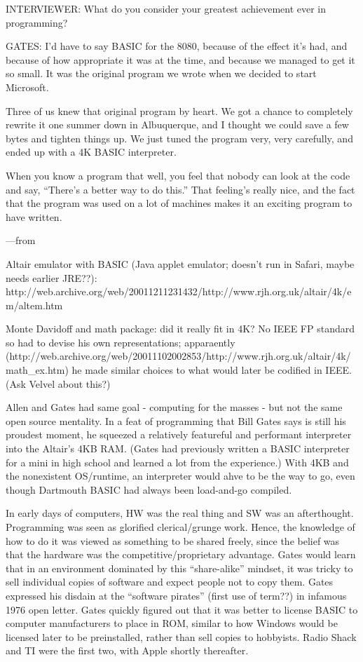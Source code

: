 \documentclass{article}
\begin{document}
INTERVIEWER: What do you consider your greatest achievement ever in programming?

GATES: I'd have to say BASIC for the 8080, because of the effect it's
had, and because of how appropriate it was at the time, and because we
managed to get it so small. It was the original program we wrote when we
decided to start Microsoft.

Three of us knew that original program by heart. We got a chance to
completely rewrite it one summer down in Albuquerque, and I thought we
could save a few bytes and tighten things up. We just tuned the program
very, very carefully, and ended up with a 4K BASIC interpreter.

When you know a program that well, you feel that nobody can look at the
code and say, ``There's a better way to do this.'' That feeling's really
nice, and the fact that the program was used on a lot of machines makes
it an exciting program to have written.

---from \cite{programmers_at_work}

Altair emulator with BASIC (Java applet emulator; doesn't run in Safari,
maybe needs earlier JRE??): 
http://web.archive.org/web/20011211231432/http://www.rjh.org.uk/altair/4k/em/altem.htm

Monte Davidoff and math package: did it really fit in 4K?  No IEEE FP
standard so had to devise his own representations; apparaently
(http://web.archive.org/web/20011102002853/http://www.rjh.org.uk/altair/4k/math_ex.htm)
he made similar choices to what would later be codified in IEEE.  (Ask
Velvel about this?)

Allen and Gates had same goal - computing for the masses - but not the
same open source mentality.  In a feat of programming that Bill Gates
says is still his proudest moment, he squeezed a relatively featureful
and performant interpreter into the Altair's 4KB RAM.  (Gates had
previously written a BASIC interpreter for  a mini in high school and
learned a lot from the experience.)  With 4KB and the nonexistent
OS/runtime, an interpreter would ahve to be the way to go, even though
Dartmouth BASIC had always been load-and-go compiled.

In early days of computers, HW was the real thing and SW was an
afterthought.  Programming was seen as glorified clerical/grunge work.
Hence, the knowledge of how to do it was viewed as something to be
shared freely, since the belief was that the hardware was the
competitive/proprietary advantage.
Gates would learn that in an environment dominated by this
``share-alike'' mindset, it was
tricky to sell individual copies of software and expect people not to
copy them.  Gates
expressed his disdain at the ``software pirates'' (first use of term??) in infamous
1976 open letter.
Gates quickly figured out that it was better to license BASIC to
computer manufacturers to place in ROM, similar to how Windows would be
licensed later to be preinstalled, rather than sell copies to
hobbyists.  Radio Shack and TI were the first two, with Apple shortly
thereafter.  
\end{document}
